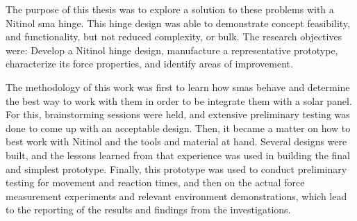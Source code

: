 The purpose of this thesis was to explore a solution to these problems with a Nitinol \gls{sma} hinge. This hinge design was able to demonstrate concept feasibility, and functionality, but not reduced complexity, or bulk.
The research objectives were: Develop a Nitinol hinge design, manufacture a representative prototype, characterize its force properties, and identify areas of improvement.

The methodology of this work was first to learn how \gls{sma}s behave and determine the best way to work with them in order to be integrate them with a solar panel. For this, brainstorming sessions were held, and extensive preliminary testing was done to come up with an acceptable design. Then, it became a matter on how to best work with Nitinol and the  tools and material at hand. Several designs were built, and the lessons learned from that experience was used in building the final and simplest prototype. Finally, this prototype was used to conduct preliminary testing for movement and reaction times, and then on the actual force measurement experiments and relevant environment demonstrations, which lead to the reporting of the results and findings from the investigations.  


                                                                 

